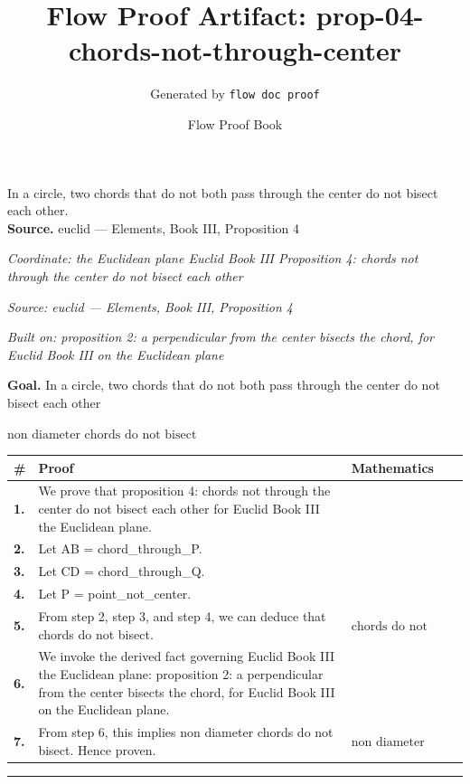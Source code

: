 \documentclass[11pt]{article}
\title{Flow Proof Artifact: prop-04-chords-not-through-center}
\author{Generated by \texttt{flow doc proof}}
\date{Flow Proof Book}
\theoremstyle{definition}
\begin{document}
\maketitle
In a circle, two chords that do not both pass through the center do not bisect each other.\\[0.5em]
\textbf{Source.} euclid — Elements, Book III, Proposition 4\\[0.5em]
\bigskip
{}\par
\smallskip\noindent\textit{Coordinate: the Euclidean plane \cdot Euclid Book III \cdot Proposition 4: chords not through the center do not bisect each other}\par
\smallskip\noindent\textit{Source: euclid — Elements, Book III, Proposition 4}\par
\smallskip\noindent\textit{Built on: proposition 2: a perpendicular from the center bisects the chord, for Euclid Book III on the Euclidean plane}\par
\medskip
\noindent\textbf{Goal.} In a circle, two chords that do not both pass through the center do not bisect each other\par
\noindent$\displaystyle \text{non diameter chords do not bisect}$\par
\medskip
\noindent
\begin{tabular}{@{} >{\raggedright\arraybackslash}p{} >{\raggedright\arraybackslash}p{} >{\raggedleft\arraybackslash}p{} @{}}
\textbf{\#} & \textbf{Proof} & \textbf{Mathematics} \\
\midrule
\textbf{1.} & We prove that proposition 4: chords not through the center do not bisect each other for Euclid Book III the Euclidean plane. & \\[0.45em]
\textbf{2.} & Let AB = chord\_through\_P. & \\[0.45em]
\textbf{3.} & Let CD = chord\_through\_Q. & \\[0.45em]
\textbf{4.} & Let P = point\_not\_center. & \\[0.45em]
\textbf{5.} & From step 2, step 3, and step 4, we can deduce that chords do not bisect. & $\displaystyle \text{chords do not bisect}$ \\[0.45em]
\textbf{6.} & We invoke the derived fact governing Euclid Book III the Euclidean plane: proposition 2: a perpendicular from the center bisects the chord, for Euclid Book III on the Euclidean plane. & \\[0.45em]
\textbf{7.} & From step 6, this implies non diameter chords do not bisect. Hence proven. & $\displaystyle \text{non diameter chords do not bisect}$ \\[0.45em]
\bottomrule
\end{tabular}
\label{thm:Geometry-Euclid Book III-proposition_4_chords_not_through_the_center_do_not_bisect_each_other}
\par\medskip\hrule
\end{document}
